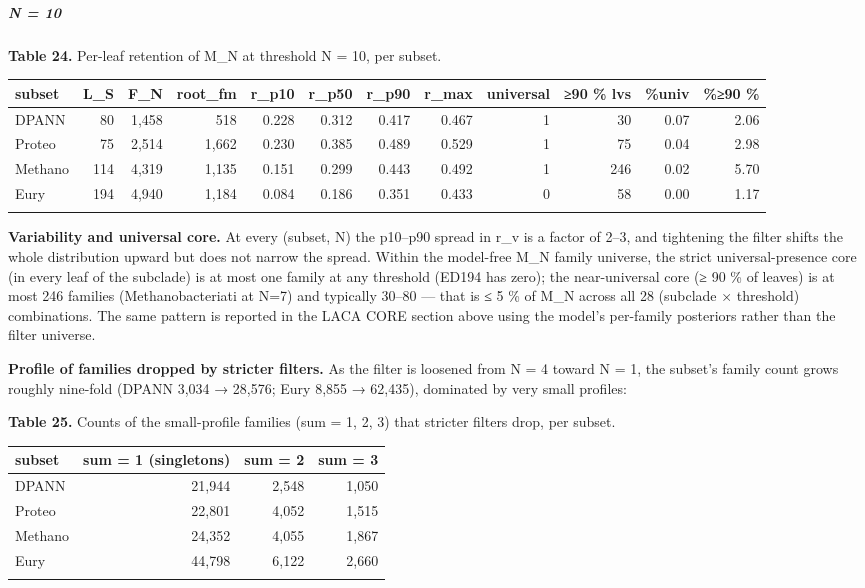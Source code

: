 \documentclass[
  10pt,
]{article}
\begin{document}
\subparagraph{N = 10}\label{n--10}

\textbf{Table 24.} Per-leaf retention of M\_N at threshold N = 10, per
subset.

\begin{center}
\begin{adjustbox}{max width=\textwidth}
\begin{tabular}{@{}lrrrrrrrrrrr@{}}
\toprule\noalign{}
subset & L\_S & F\_N & root\_fm & r\_p10 & r\_p50 & r\_p90 & r\_max &
universal & ≥90 \% lvs & \%univ & \%≥90 \% \\
\midrule\noalign{}
DPANN & 80 & 1,458 & 518 & 0.228 & 0.312 & 0.417 & 0.467 & 1 & 30 & 0.07
& 2.06 \\
Proteo & 75 & 2,514 & 1,662 & 0.230 & 0.385 & 0.489 & 0.529 & 1 & 75 &
0.04 & 2.98 \\
Methano & 114 & 4,319 & 1,135 & 0.151 & 0.299 & 0.443 & 0.492 & 1 & 246
& 0.02 & 5.70 \\
Eury & 194 & 4,940 & 1,184 & 0.084 & 0.186 & 0.351 & 0.433 & 0 & 58 &
0.00 & 1.17 \\
\bottomrule\noalign{}
\end{tabular}
\end{adjustbox}
\end{center}

\textbf{Variability and universal core.} At every (subset, N) the
p10--p90 spread in r\_v is a factor of 2--3, and tightening the filter
shifts the whole distribution upward but does not narrow the spread.
Within the model-free M\_N family universe, the strict
universal-presence core (in every leaf of the subclade) is at most one
family at any threshold (ED194 has zero); the near-universal core (≥ 90
\% of leaves) is at most 246 families (Methanobacteriati at N=7) and
typically 30--80 --- that is ≤ 5 \% of M\_N across all 28 (subclade ×
threshold) combinations. The same pattern is reported in the LACA CORE
section above using the model's per-family posteriors rather than the
filter universe.

\textbf{Profile of families dropped by stricter filters.} As the filter
is loosened from N = 4 toward N = 1, the subset's family count grows
roughly nine-fold (DPANN 3,034 → 28,576; Eury 8,855 → 62,435), dominated
by very small profiles:

\textbf{Table 25.} Counts of the small-profile families (sum = 1, 2, 3)
that stricter filters drop, per subset.

\begin{center}
\begin{adjustbox}{max width=\textwidth}
\begin{tabular}{@{}lrrr@{}}
\toprule\noalign{}
subset & sum = 1 (singletons) & sum = 2 & sum = 3 \\
\midrule\noalign{}
DPANN & 21,944 & 2,548 & 1,050 \\
Proteo & 22,801 & 4,052 & 1,515 \\
Methano & 24,352 & 4,055 & 1,867 \\
Eury & 44,798 & 6,122 & 2,660 \\
\bottomrule\noalign{}
\end{tabular}
\end{adjustbox}
\end{center}
\end{document}
